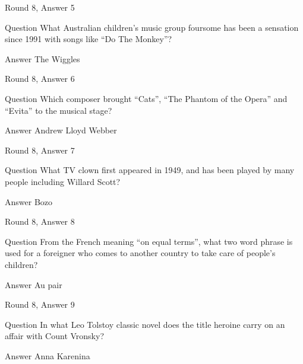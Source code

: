 \documentclass[11pt]{beamer}
\begin{document}
\begin{frame}[t]{Round 8, Answer 5}
\vspace{2em}
\begin{block}{Question}
What Australian children's music group foursome has been a sensation since 1991 with songs like ``Do The Monkey''\@?
\end{block}
\pause{}
\begin{block}{Answer}
The Wiggles
\end{block}
\end{frame}
    

\begin{frame}[t]{Round 8, Answer 6}
\vspace{2em}
\begin{block}{Question}
Which composer brought ``Cats'', ``The Phantom of the Opera'' and ``Evita'' to the musical stage\@?
\end{block}
\pause{}
\begin{block}{Answer}
Andrew Lloyd Webber
\end{block}
\end{frame}
    

\begin{frame}[t]{Round 8, Answer 7}
\vspace{2em}
\begin{block}{Question}
What TV clown first appeared in 1949, and has been played by many people including Willard Scott\@?
\end{block}
\pause{}
\begin{block}{Answer}
Bozo
\end{block}
\end{frame}
    

\begin{frame}[t]{Round 8, Answer 8}
\vspace{2em}
\begin{block}{Question}
From the French meaning ``on equal terms'', what two word phrase is used for a foreigner who comes to another country to take care of people's children\@?
\end{block}
\pause{}
\begin{block}{Answer}
Au pair
\end{block}
\end{frame}
    

\begin{frame}[t]{Round 8, Answer 9}
\vspace{2em}
\begin{block}{Question}
In what Leo Tolstoy classic novel does the title heroine carry on an affair with Count Vronsky\@?
\end{block}
\pause{}
\begin{block}{Answer}
Anna Karenina
\end{block}
\end{frame}
    
\end{document}
